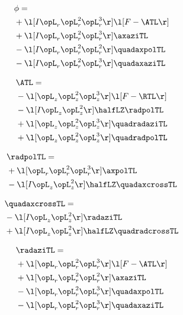 \begin{alignat}{2} 
\label{eq:scalarFlux_0} 
& \phi = \\ 
& + \l[ I \opL_r \opL_r^{2} \opL_r^{3}  \r] \l[ F - \ATL \r] \nonumber \\ 
& + \l[ I \opL_r \opL_r^{2} \opL_r^{3}  \r] \axaziTL \nonumber \\ 
& - \l[ I \opL_r \opL_r^{2} \opL_r^{2}  \r] \quadaxpolTL \nonumber \\ 
& - \l[ I \opL_r \opL_r^{2} \opL_r^{3}  \r] \quadaxaziTL \nonumber \\ 
\end{alignat} 


\begin{alignat}{2} 
\label{eq:isoATL_0} 
& \ATL = \\ 
& - \l[ \opL_z \opL_z^{2} \opL_z^{3}  \r] \l[ F - \RTL \r] \nonumber \\ 
& - \l[ I \opL_z \opL_z^{2}  \r] \halfLZ \radpolTL \nonumber \\ 
& + \l[ \opL_z \opL_z^{2} \opL_z^{3}  \r] \quadradaziTL \nonumber \\ 
& + \l[ \opL_z \opL_z^{2} \opL_z^{3}  \r] \quadradpolTL \nonumber \\ 
\end{alignat} 


\begin{alignat}{2} 
\label{eq:linradpolTL_0} 
& \radpolTL = \\ 
& + \l[ \opL_r \opL_r^{2} \opL_r^{3}  \r] \axpolTL \nonumber \\ 
& - \l[ I \opL_z \opL_z^{2}  \r] \halfLZ \quadaxcrossTL \nonumber \\ 
\end{alignat} 


\begin{alignat}{2} 
\label{eq:quadaxcrossTL_0} 
& \quadaxcrossTL = \\ 
& - \l[ I \opL_z \opL_z^{2}  \r] \radaziTL \nonumber \\ 
& + \l[ I \opL_z \opL_z^{2}  \r] \halfLZ \quadradcrossTL \nonumber \\ 
\end{alignat} 


\begin{alignat}{2} 
\label{eq:linradaziTL_0} 
& \radaziTL = \\ 
& + \l[ \opL_r \opL_r^{2} \opL_r^{3}  \r] \l[ F - \ATL \r] \nonumber \\ 
& + \l[ \opL_r \opL_r^{2} \opL_r^{2}  \r] \axaziTL \nonumber \\ 
& - \l[ \opL_r \opL_r^{2} \opL_r^{3}  \r] \quadaxpolTL \nonumber \\ 
& - \l[ \opL_r \opL_r^{2} \opL_r^{3}  \r] \quadaxaziTL \nonumber \\ 
\end{alignat} 


